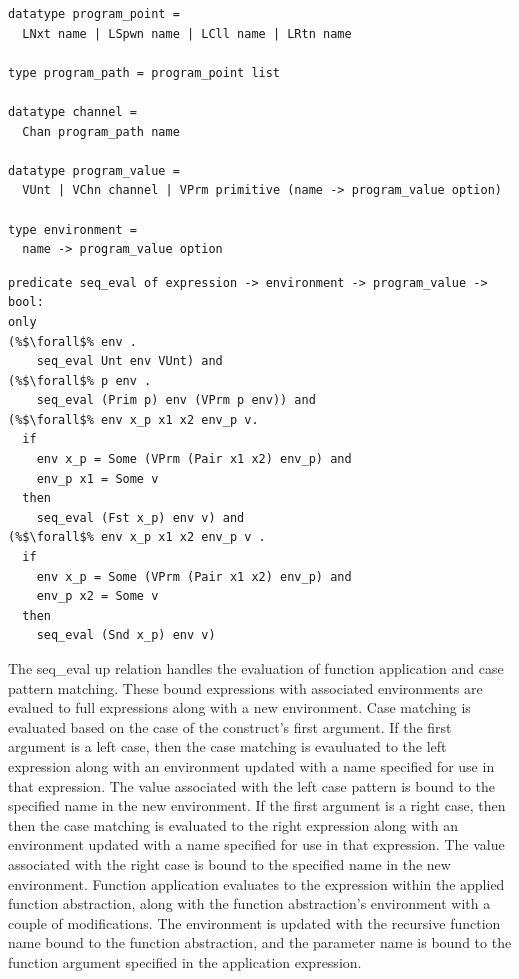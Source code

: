 \documentclass{article}
\begin{document}
\begin{lstlisting}[language=logic, escapechar=\%]
datatype program_point =
  LNxt name | LSpwn name | LCll name | LRtn name 

type program_path = program_point list

datatype channel =
  Chan program_path name 

datatype program_value = 
  VUnt | VChn channel | VPrm primitive (name -> program_value option)

type environment =
  name -> program_value option

\end{lstlisting}


\begin{lstlisting}[language=logic, escapechar=\%]
predicate seq_eval of expression -> environment -> program_value -> bool:
only
(%$\forall$% env . 
    seq_eval Unt env VUnt) and
(%$\forall$% p env .
    seq_eval (Prim p) env (VPrm p env)) and
(%$\forall$% env x_p x1 x2 env_p v. 
  if
    env x_p = Some (VPrm (Pair x1 x2) env_p) and
    env_p x1 = Some v
  then
    seq_eval (Fst x_p) env v) and
(%$\forall$% env x_p x1 x2 env_p v . 
  if
    env x_p = Some (VPrm (Pair x1 x2) env_p) and 
    env_p x2 = Some v 
  then
    seq_eval (Snd x_p) env v)

\end{lstlisting}


The seq\_eval up relation handles the evaluation of function application and case pattern
matching. These bound expressions with associated environments are evalued to full expressions
along with a new environment.  Case matching is evaluated based on the case of the construct's
first argument. If the first argument is a left case, then the case matching is evauluated to
the left expression along with an environment updated with a name specified for use in that
expression. The value associated with the left case pattern is bound to the specified name in
the new environment. If the first argument is a right case, then then the case matching is
evaluated to the right expression along with an environment updated with a name specified for
use in that expression. The value associated with the right case is bound to the specified
name in the new environment. Function application evaluates to the expression within the
applied function abstraction, along with the function abstraction's environment with a couple
of modifications. The environment is updated with the recursive function name bound to the
function abstraction, and the parameter name is bound to the function argument specified in the
application expression. 
\end{document}
